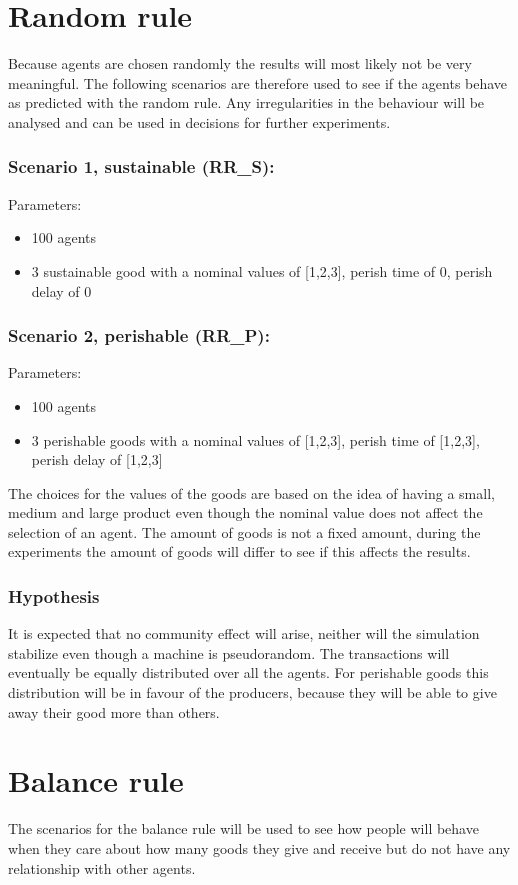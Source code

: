 \documentclass[twoside,openright]{uva-bachelor-thesis}
\begin{document}
\section{Random rule}
Because agents are chosen randomly the results will most likely not be very meaningful. The following scenarios are therefore used to see if the agents behave as predicted with the random rule.  Any irregularities in the behaviour will be analysed and can be used in decisions for further experiments.
\subsubsection{Scenario 1, sustainable (RR\_S):}
Parameters:
\begin{itemize}
\item	100 agents
\item	3 sustainable good with a nominal values of [1,2,3], perish time of 0, perish delay of 0
\end{itemize}
\subsubsection{Scenario 2, perishable (RR\_P):}
Parameters:
\begin{itemize}
\item	100 agents
\item	3 perishable goods with a nominal values of [1,2,3], perish time of [1,2,3], perish delay of [1,2,3]
\end{itemize}
The choices for the values of the goods are based on the idea of having a small, medium and large product even though the nominal value does not affect the selection of an agent. The amount of goods is not a fixed amount, during the experiments the amount of goods will differ to see if this affects the results.

\subsubsection{Hypothesis}
It is expected that no community effect will arise, neither will the simulation stabilize even though a machine is pseudorandom. The transactions will eventually be equally distributed over all the agents. For perishable goods this distribution will be in favour of the producers, because they will be able to give away their good more than others.

\section{Balance rule}
The scenarios for the balance rule will be used to see how people will behave when they care about how many goods they give and receive but do not have any relationship with other agents.
\end{document}
